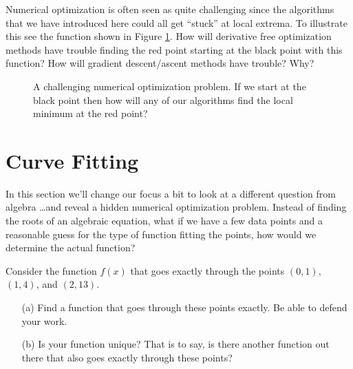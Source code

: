 \begin{problem}
    Numerical optimization is often seen as quite challenging since the algorithms that
    we have introduced here could all get ``stuck'' at local extrema.  To illustrate this
    see the function shown in Figure \ref{fig:num_opt_challenging}.  How will derivative
    free optimization methods have trouble finding the red point starting at the black
    point with this function?  How will gradient
    descent/ascent methods have trouble?  Why?
\end{problem}

\begin{figure}
    \begin{center}
    \end{center}
    \caption{A challenging numerical optimization problem. If we start at the black point
    then how will any of our algorithms find the local minimum at the red point?}
    \label{fig:num_opt_challenging}
\end{figure}



\newpage\section{Curve Fitting}
In this section we'll change our focus a bit to look at a different question from algebra
\ldots and reveal a hidden numerical optimization problem.
Instead of finding the roots of an algebraic equation, what if we have a few data points
and a reasonable guess for the type of function fitting the points, how would we determine
the actual function?  

\begin{problem}
    Consider the function $f(x)$ that goes exactly through the points $(0,1)$, $(1,4)$,
    and $(2,13)$.  
    \begin{enumerate}
        \item[(a)] Find a function that goes through these points exactly.  Be able to
            defend your work.
        \item[(b)] Is your function unique?  That is to say, is there another function out
            there that also goes exactly through these points?  
    \end{enumerate}
\end{problem}

